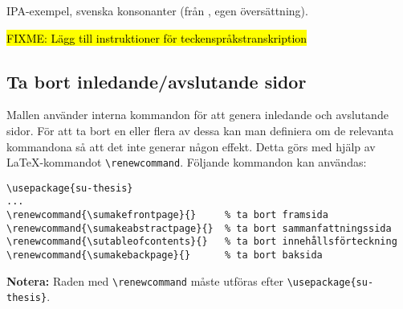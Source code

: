 \begin{table}
  \caption{IPA-exempel, svenska konsonanter (från \citealp[140]{engstrand-1999},
    egen översättning).}
  \label{tabell-svenska-konsonanter}
  \vspace{.5em}
  
  \vspace{1em}
\end{table}

\hl{FIXME: Lägg till instruktioner för teckenspråkstranskription}


\subsection{Ta bort inledande/avslutande sidor}
\label{genererade}

Mallen använder interna kommandon för att genera inledande och avslutande
sidor. För att ta bort en eller flera av dessa kan man definiera om de
relevanta kommandona så att det inte generar någon effekt. Detta görs med hjälp
av \LaTeX-kommandot \verb|\renewcommand|. Följande kommandon kan användas:

\begin{verbatim}
\usepackage{su-thesis}
...
\renewcommand{\sumakefrontpage}{}     % ta bort framsida
\renewcommand{\sumakeabstractpage}{}  % ta bort sammanfattningssida
\renewcommand{\sutableofcontents}{}   % ta bort innehållsförteckning
\renewcommand{\sumakebackpage}{}      % ta bort baksida
\end{verbatim}

\noindent\textbf{Notera:} Raden med \verb|\renewcommand| måste utföras efter
\verb|\usepackage{su-thesis}|.

